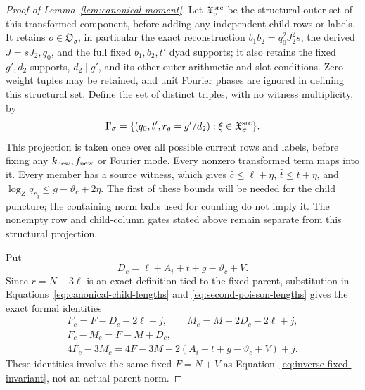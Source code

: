 \documentclass[12pt]{article}
\begin{document}
\begin{proof}[Proof of Lemma~\ref{lem:canonical-moment}]
Let \(\mathfrak X_\sigma^{\rm src}\) be the structural outer set of
this transformed component, before adding any independent child rows
or labels.  It retains
\(o\in\mathfrak O_\sigma\), in particular the exact reconstruction
\(b_1b_2=q_0^2J_2^2s\), the derived \(J=sJ_2,q_0\), and the full
fixed \(b_1,b_2,t'\) dyad supports; it also retains the fixed
\(g',d_2\) supports, \(d_2\mid g'\), and its other outer arithmetic
and slot conditions.  Zero-weight tuples may be retained, and unit
Fourier phases are ignored in defining this structural set.  Define
the set of distinct triples, with no witness multiplicity, by
\begin{equation}\label{eq:inverse-source-triples}
 \Gamma_\sigma=
 \{(q_0,t',r_g=g'/d_2):\xi\in\mathfrak X_\sigma^{\rm src}\}.
\end{equation}
This projection is taken once over all possible current rows and
labels, before fixing any \(k_{\rm new},f_{\rm new}\) or Fourier
mode.  Every nonzero transformed term maps into it.  Every member
has a source witness, which gives
\(\widehat c\le\ell+\eta\), \(\widehat t\le t+\eta\), and
\(\log_Zq_{r_g}\le g-\vartheta_c+2\eta\).  The first of these bounds
will be needed for the child puncture; the containing norm balls
used for counting do not imply it.  The nonempty row and child-column gates stated above
remain separate from this structural projection.

Put
\[
 D_c=\ell+A_i+t+g-\vartheta_c+V.
\]
Since \(r=N-3\ell\) is an exact definition tied to the fixed parent,
substitution in Equations~\eqref{eq:canonical-child-lengths} and
\eqref{eq:second-poisson-lengths} gives the exact formal identities
\begin{equation}\label{eq:canonical-transition}
 \begin{gathered}
 F_c=F-D_c-2\ell+j,\qquad M_c=M-2D_c-2\ell+j,\\
 F_c-M_c=F-M+D_c,\\
 4F_c-3M_c=4F-3M+2(A_i+t+g-\vartheta_c+V)+j.
 \end{gathered}
\end{equation}
These identities involve the same fixed \(F=N+V\) as
Equation~\eqref{eq:inverse-fixed-invariant}, not an actual parent norm.


\end{proof}
\end{document}
